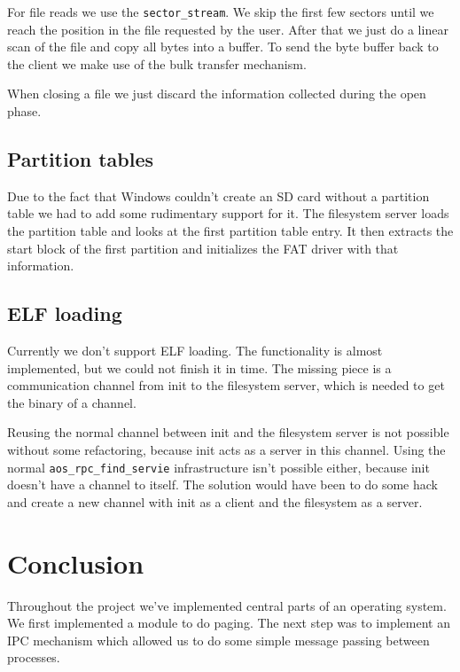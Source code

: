 \documentclass[a4paper,10pt]{article}
\begin{document}
For file reads we use the \lstinline!sector_stream!.
We skip the first few sectors until we reach the position in the file requested by the user.
After that we just do a linear scan of the file and copy all bytes into a buffer.
To send the byte buffer back to the client we make use of the bulk transfer mechanism.

When closing a file we just discard the information collected during the open phase.

\subsection{Partition tables}
Due to the fact that Windows couldn't create an SD card without a partition table we had to add some rudimentary support for it.
The filesystem server loads the partition table and looks at the first partition table entry.
It then extracts the start block of the first partition and initializes the FAT driver with that information.

\subsection{ ELF loading}

Currently we don't support ELF loading.
The functionality is almost implemented, but we could not finish it in time.
The missing piece is a communication channel from init to the filesystem server, which is needed to get the binary of a channel.

Reusing the normal channel between init and the filesystem server is not possible without some refactoring, because init acts as a server in this channel.
Using the normal \lstinline!aos_rpc_find_servie! infrastructure isn't possible either, because init doesn't have a channel to itself.
The solution would have been to do some hack and create a new channel with init as a client and the filesystem as a server.



\section{Conclusion}
Throughout the project we've implemented central parts of an operating system.
We first implemented a module to do paging.
The next step was to implement an IPC mechanism which allowed us to do some simple message passing between processes.
\end{document}
